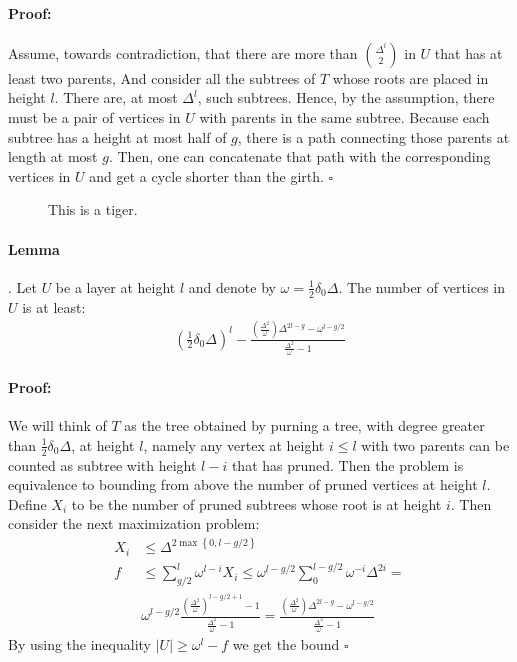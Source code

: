 \documentclass{article}
\begin{document}
\begin{multicols*}{2}
\paragraph{Proof:}Assume, towards contradiction, that there are more than $ \Delta^l \choose 2 $ in $U$ that has at least two parents, And consider all the subtrees of $T$ whose roots are placed in height $l$. There are, at most $\Delta^l$, such subtrees. Hence, by the assumption, there must be a pair of vertices in $U$ with parents in the same subtree. Because each subtree has a height at most half of $g$, there is a path connecting those parents at length at most $g$. Then, one can concatenate that path with the corresponding vertices in $U$ and get a cycle shorter than the girth. $\square$
\begin{figure*}[t]

\caption{This is a tiger.}
\end{figure*}
\paragraph{Lemma}. Let $U$ be a layer at height $l$ and denote by $ \omega = \frac{1}{2}\delta_{0}\Delta$. The number of vertices in $U$ is at least: 
\begin{equation*}
  \begin{split}
    \left( \frac{1}{2}\delta_0\Delta \right)^{l}- \frac{\left( \frac{\Delta^{2}}{\omega} \right)\Delta^{2l-g} - \omega^{l-g/2} }{\frac{\Delta^{2}}{\omega}-1}
  \end{split}
\end{equation*}

\paragraph{Proof:} We will think of $T$ as the tree obtained by purning a tree, with degree greater than $\frac{1}{2}\delta_{0}\Delta$, at height $l$, namely any vertex at height $i \le l $ with two parents can be counted as subtree with height $l-i$ that has pruned. Then the problem is equivalence to bounding from above the number of pruned vertices at height $l$. Define $X_{i}$ to be the number of pruned subtrees whose root is at height $i$. Then consider the next maximization problem: 
\begin{equation*}
  \begin{split}
    X_{i} & \le \Delta^{2\max \left\{ 0, l-g/2 \right\}} \\ 
    f & \le \sum_{g/2}^{l}{\omega^{l-i}X_{i} } \le \omega^{l-g/2}\sum_{0}^{l-g/2}{\omega^{-i}\Delta^{2i} } = \\ & \omega^{l-g/2}\frac{\left( \frac{\Delta^{2}}{\omega} \right)^{l-g/2+1}-1}{\frac{\Delta^{2}}{\omega}-1} =  
      \frac{\left( \frac{\Delta^{2}}{\omega} \right)\Delta^{2l-g} - \omega^{l-g/2} }{\frac{\Delta^{2}}{\omega}-1}
  \end{split}
\end{equation*}
By using the inequality $ |U| \ge \omega^{l} - f $ we get the bound $\square$ 

\end{multicols*}
\end{document}

